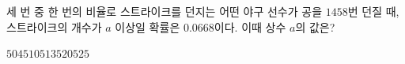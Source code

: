 세 번 중 한 번의 비율로 스트라이크를 던지는 어떤 야구 선수가 공을 $1458$번 던질 때, 스트라이크의 개수가 $a$ 이상일 확률은 $0.0668$이다. 이때 상수 $a$의 값은? 
\begin{choices32}{$504$}{$510$}{$513$}{$520$}{$525$}\end{choices32}
